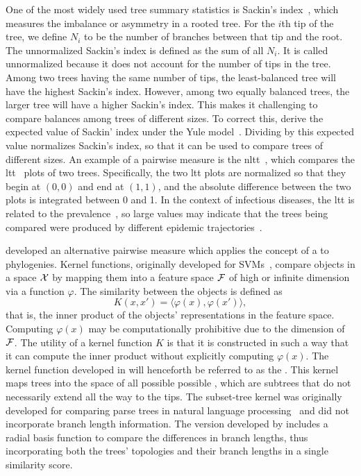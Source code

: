 One of the most widely used tree summary statistics is Sackin's
index~\autocite{shao1990tree}, which measures the imbalance or asymmetry in a
rooted tree. For the $i$th tip of the tree, we define $N_i$ to be the number of
branches between that tip and the root. The unnormalized Sackin's index is
defined as the sum of all $N_i$. It is called unnormalized because it does not
account for the number of tips in the tree. Among two trees having the same
number of tips, the least-balanced tree will have the highest Sackin's index.
However, among two equally balanced trees, the larger tree will have a higher
Sackin's index. This makes it challenging to compare balances among trees of
different sizes. To correct this, \textcite{kirkpatrick1993searching} derive
the expected value of Sackin' index under the Yule
model~\autocite{yule1925mathematical}. Dividing by this expected value
normalizes Sackin's index, so that it can be used to compare trees of different
sizes. An example of a pairwise measure is the
\gls{nltt}~\autocite{janzen2015approximate}, which compares the
\gls{ltt}~\autocite{nee1992tempo} plots of two trees. Specifically, the two
\gls{ltt} plots are normalized so that they begin at $(0, 0)$ and end at $(1,
1)$, and the absolute difference between the two plots is integrated between 0
and 1. In the context of infectious diseases, the \gls{ltt} is related to the
prevalence~\autocite{holmes1995revealing}, so large values may indicate that
the trees being compared were produced by different epidemic
trajectories~\autocite{janzen2015approximate}.

\textcite{poon2013mapping} developed an alternative pairwise measure which
applies the concept of a  to phylogenies. Kernel
functions, originally developed for \glspl{SVM}~\autocite{burges1998tutorial}, 
compare objects in a space $\mathcal{X}$ by mapping them into a feature space $\mathcal{F}$ of
high or infinite dimension via a function $\varphi$. The similarity between the
objects is defined as
\[  
  K(x, x') = \langle \varphi(x), \varphi(x')\rangle,
\]
that is, the inner product of the objects' representations in the feature
space. Computing $\varphi(x)$ may be computationally prohibitive due to the
dimension of $\mathcal{F}$. The utility of a kernel function $K$ is that it is
constructed in such a way that it can compute the inner product without
explicitly computing $\varphi(x)$. The kernel function developed in
\autocite{poon2013mapping} will henceforth be referred to as the . This kernel maps trees into the space of all possible possible
, which are subtrees that do not necessarily extend all the
way to the tips. The subset-tree kernel was originally developed for comparing
parse trees in natural language processing~\autocite{collins2002new} and did
not incorporate branch length information. The version developed by
\textcite{poon2013mapping} includes a radial basis function to compare the
differences in branch lengths, thus incorporating both the trees' topologies
and their branch lengths in a single similarity score. 

